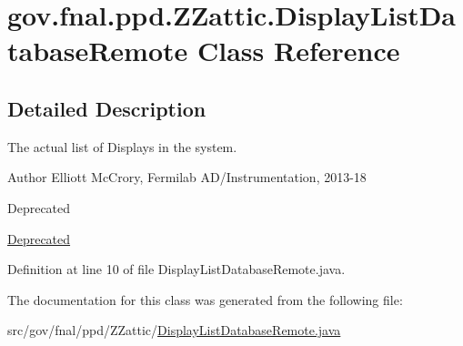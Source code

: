 \hypertarget{classgov_1_1fnal_1_1ppd_1_1ZZattic_1_1DisplayListDatabaseRemote}{\section{gov.\-fnal.\-ppd.\-Z\-Zattic.\-Display\-List\-Database\-Remote Class Reference}
\label{classgov_1_1fnal_1_1ppd_1_1ZZattic_1_1DisplayListDatabaseRemote}
}


\subsection{Detailed Description}
The actual list of Displays in the system.

\begin{DoxyAuthor}{Author}
Elliott Mc\-Crory, Fermilab A\-D/\-Instrumentation, 2013-\/18 
\end{DoxyAuthor}
\begin{DoxyRefDesc}{Deprecated}
\item[\hyperlink{deprecated__deprecated000011}{Deprecated}]\end{DoxyRefDesc}


Definition at line 10 of file Display\-List\-Database\-Remote.\-java.



The documentation for this class was generated from the following file\-:\begin{DoxyCompactItemize}
\item 
src/gov/fnal/ppd/\-Z\-Zattic/\hyperlink{DisplayListDatabaseRemote_8java}{Display\-List\-Database\-Remote.\-java}\end{DoxyCompactItemize}
